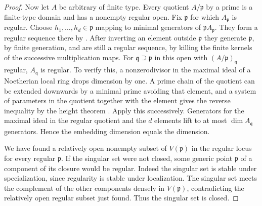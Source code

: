 \documentclass[11pt,oneside,openany]{book}
\theoremstyle{definition}
\theoremstyle{remark}
\begin{document}
\begin{proof}
Now let \(A\) be arbitrary of finite type. Every quotient \(A/\mathfrak p\) by a prime is a finite-type domain and has a nonempty regular open. Fix \(\mathfrak p\) for which \(A_{\mathfrak p}\) is regular. Choose \(h_1,\ldots,h_d\in\mathfrak p\) mapping to minimal generators of \(\mathfrak p A_{\mathfrak p}\). They form a regular sequence there by \cite[CM-08]{core}. After inverting an element outside \(\mathfrak p\) they generate \(\mathfrak p\), by finite generation, and are still a regular sequence, by killing the finite kernels of the successive multiplication maps. For \(\mathfrak q\supseteq\mathfrak p\) in this open with \((A/\mathfrak p)_{\mathfrak q}\) regular, \(A_{\mathfrak q}\) is regular. To verify this, a nonzerodivisor in the maximal ideal of a Noetherian local ring drops dimension by one. A prime chain of the quotient can be extended downwards by a minimal prime avoiding that element, and a system of parameters in the quotient together with the element gives the reverse inequality by the height theorem \cite[ALG-05-C03-R01/S01]{p103}. Apply this successively. Generators for the maximal ideal in the regular quotient and the \(d\) elements lift to at most \(\dim A_{\mathfrak q}\) generators. Hence the embedding dimension equals the dimension.

We have found a relatively open nonempty subset of \(V(\mathfrak p)\) in the regular locus for every regular \(\mathfrak p\). If the singular set were not closed, some generic point \(\mathfrak p\) of a component of its closure would be regular. Indeed the singular set is stable under specialization, since regularity is stable under localization. The singular set meets the complement of the other components densely in \(V(\mathfrak p)\), contradicting the relatively open regular subset just found. Thus the singular set is closed.
\end{proof}
\end{document}
